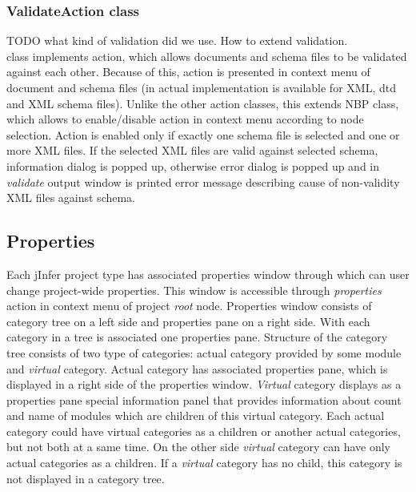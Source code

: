 \documentclass[a4paper,10pt,oneside]{article}
\newcommand{\code}[1]{\texttt{\StrSubstitute{#1}{.}{.\.}}}
\def\.{\discretionary{}{}{}}
\begin{document}
\subsubsection{ValidateAction class}\label{validate-action}

TODO what kind of validation did we use. How to extend validation.\\

\code{ValidateAction} class implements action, which allows documents and schema files to be validated against each other. Because of this, action is presented in context menu of document and schema files (in actual implementation is available for XML, dtd and XML schema files). Unlike the other action classes, this extends NBP \code{NodeAction} class, which allows to enable/disable action in context menu according to node selection. Action is enabled only if exactly one schema file is selected and one or more XML files. If the selected XML files are valid against selected schema, information dialog is popped up, otherwise error dialog is popped up and in \emph{validate} output window is printed error message describing cause of non-validity XML files against schema.

\subsection{Properties}

Each jInfer project type has associated properties window through which can user change project-wide properties. This window is accessible through \emph{properties} action in context menu of project \emph{root} node. Properties window consists of category tree on a left side and properties pane on a right side. With each category in a tree is associated one properties pane. Structure of the category tree consists of two type of categories: actual category provided by some module and \emph{virtual} category. Actual category has associated properties pane, which is displayed in a right side of the properties window. \emph{Virtual} category displays as a properties pane special information panel that provides information about count and name of modules which are children of this virtual category. Each actual category could have virtual categories as a children or another actual categories, but not both at a same time. On the other side \emph{virtual} category can have only actual categories as a children. If a \emph{virtual} category has no child, this category is not displayed in a category tree.\\
\end{document}
